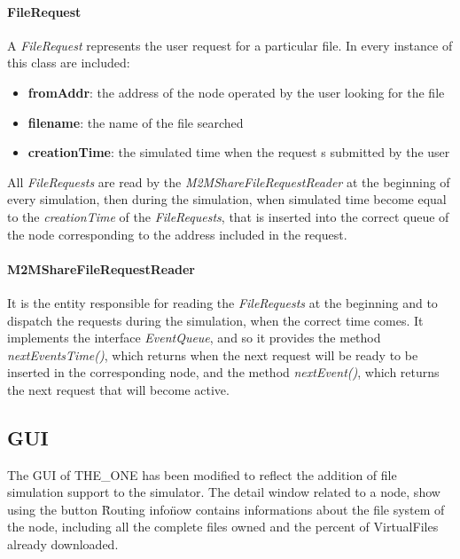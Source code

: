 \paragraph{FileRequest}
A \textit{FileRequest} represents the user request for a particular file. In every instance of this class are included:
\begin{itemize}
\item \textbf{fromAddr}: the address of the node operated by the user looking for the file
\item \textbf{filename}: the name of the file searched
\item \textbf{creationTime}: the simulated time when the request s submitted by the user 
\end{itemize}
All \textit{FileRequests} are read by the \textit{M2MShareFileRequestReader} at the beginning of every simulation, then during the simulation, when simulated time become equal to the \textit{creationTime} of the \textit{FileRequests}, that is inserted into the correct queue of the node corresponding to the address included in the request.

\paragraph{M2MShareFileRequestReader}
It is the entity responsible for reading the \textit{FileRequests} at the beginning and to dispatch the requests during the simulation, when the correct time comes. It implements the interface \textit{EventQueue}, and so it provides the method \textit{nextEventsTime()}, which returns when the next request will be ready to be inserted in the corresponding node, and the method \textit{nextEvent()}, which returns the next request that will become active.


\subsection{GUI}
The GUI of THE\_ONE has been modified to reflect the addition of file simulation support to the simulator. The detail window related to a node, show using the button \"Routing info\" now contains informations about the file system of the node, including all the complete files owned and the percent of VirtualFiles already downloaded. 

